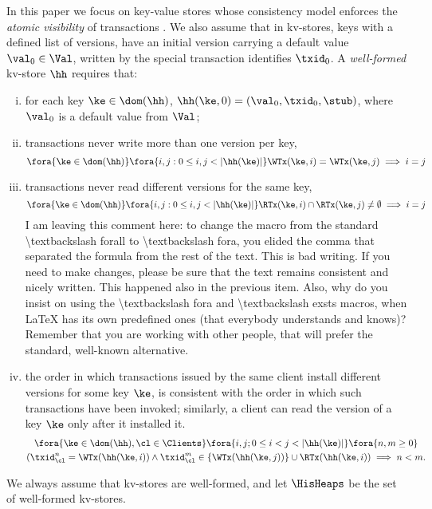 In this paper we focus on key-value stores whose consistency model enforces the  
\emph{atomic visibility} of transactions \cite{framework-concur}. 
We also assume that in kv-stores, keys with a defined list of versions, have an initial version carrying  a default value $\val_0 \in \Val$, 
written by the special transaction identifies $\txid_0$.
A \emph{well-formed} kv-store $\hh$ requires that:
\begin{enumerate}[(i)]
\item\label{kv:wf.init} for each key $\ke \in \dom(\hh)$, $\hh(\ke, 0) = (\val_0, \txid_0, \stub)$, where $\val_0$ is a default value from $\Val$;
\item\label{kv:wf.onewrite} transactions never write more than one version per key,  
\[
\fora{\ke \in \dom(\hh)} \fora{ i,j : 0 \leq i, j < \lvert \hh(\ke) \rvert}
\WTx(\ke, i) = \WTx(\ke, j) \implies i = j \]

\item\label{kv:wf.oneread} transactions never read different versions for the same key, 
\[
\fora{\ke \in \dom(\hh)} \fora{ i,j : 0 \leq i, j < \lvert \hh(\ke) \rvert} 
\RTx(\ke, i) \cap \RTx(\ke, j) \neq \emptyset \implies i = j
\]
\ac{I am leaving this comment here: to change the macro from the standard \textbackslash forall 
to \textbackslash fora, you elided the comma that separated the formula from the rest of the text. 
This is bad writing. If you need to make changes, please be sure that the text remains consistent 
and nicely written. This happened also in the previous item.}
\ac{Also, why do you insist on using the \textbackslash fora and \textbackslash exsts macros, when LaTeX has 
its own predefined ones (that everybody understands and knows)? Remember that you are working with other people, 
that will prefer the standard, well-known alternative.}
\item\label{kv:wf.so} the order 
in which transactions issued by the same client install different versions for some key $\ke$, is consistent with the order in which 
such transactions have been invoked; similarly, a client can read the version of a key $\ke$ only after it installed it. 
\begin{multline*}
\fora{ \ke \in \dom(\hh), \cl \in \Clients} \fora{ i,j; 0 \leq i < j < \lvert \hh(\ke) \rvert}
\fora{ n, m \geq 0}\\ (\txid_{\cl}^{n} = \WTx(\hh(\ke,i)) \wedge \txid_{\cl}^{m} \in \{\WTx(\hh(\ke,j))\} \cup \RTx(\hh(\ke, i)) \implies n < m.
\end{multline*}
\end{enumerate}
We always assume that kv-stores are well-formed, and let $\HisHeaps$ be the set of well-formed kv-stores.

